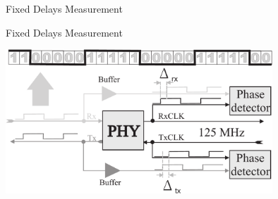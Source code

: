 \documentclass[compress,red]{beamer}
\begin{document}
\logo{}
\begin{frame}{Fixed Delays Measurement}


\end{frame}
\begin{frame}{Fixed Delays Measurement}

  \begin{center}
  \includegraphics[width=10.0cm]{misc/calibration.pdf}
  \end{center}

\end{frame}
\end{document}
